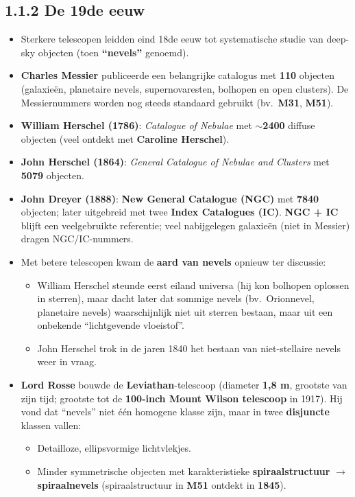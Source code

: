 \documentclass[10pt,a4paper]{article}
\begin{document}
\subsection*{1.1.2 De 19de eeuw}
\begin{itemize}
  \item Sterkere telescopen leidden eind 18de eeuw tot systematische studie van deep-sky objecten (toen \textbf{``nevels''} genoemd).
  \item \textbf{Charles Messier} publiceerde een belangrijke catalogus met \textbf{110} objecten (galaxieën, planetaire nevels, supernovaresten, bolhopen en open clusters). De Messiernummers worden nog steeds standaard gebruikt (bv.\ \textbf{M31}, \textbf{M51}).
  \item \textbf{William Herschel (1786)}: \textit{Catalogue of Nebulae} met $\sim$\textbf{2400} diffuse objecten (veel ontdekt met \textbf{Caroline Herschel}).
  \item \textbf{John Herschel (1864)}: \textit{General Catalogue of Nebulae and Clusters} met \textbf{5079} objecten.
  \item \textbf{John Dreyer (1888)}: \textbf{New General Catalogue (NGC)} met \textbf{7840} objecten; later uitgebreid met twee \textbf{Index Catalogues (IC)}. \textbf{NGC + IC} blijft een veelgebruikte referentie; veel nabijgelegen galaxieën (niet in Messier) dragen NGC/IC-nummers.
  \item Met betere telescopen kwam de \textbf{aard van nevels} opnieuw ter discussie:
  \begin{itemize}
    \item William Herschel steunde eerst eiland universa (hij kon bolhopen oplossen in sterren), maar dacht later dat sommige nevels (bv.\ Orionnevel, planetaire nevels) waarschijnlijk niet uit sterren bestaan, maar uit een onbekende ``lichtgevende vloeistof''.
    \item John Herschel trok in de jaren 1840 het bestaan van niet-stellaire nevels weer in vraag.
  \end{itemize}
  \item \textbf{Lord Rosse} bouwde de \textbf{Leviathan}-telescoop (diameter \textbf{1,8 m}, grootste van zijn tijd; grootste tot de \textbf{100-inch Mount Wilson telescoop} in 1917). Hij vond dat ``nevels'' niet één homogene klasse zijn, maar in twee \textbf{disjuncte} klassen vallen:
  \begin{itemize}
    \item Detailloze, ellipsvormige lichtvlekjes.
    \item Minder symmetrische objecten met karakteristieke \textbf{spiraalstructuur} $\rightarrow$ \textbf{spiraalnevels} (spiraalstructuur in \textbf{M51} ontdekt in \textbf{1845}).

\end{itemize}
\end{itemize}
\end{document}

